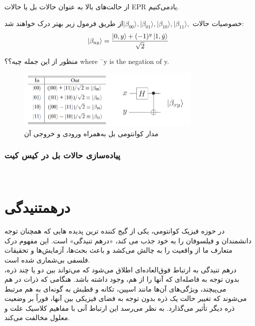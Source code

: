 \documentclass{book}
\begin{document}
 از حالت‌های بالا به عنوان حالات بل یا حالات EPR یاد‌می‌کنیم.
  
  
خصوصیات حالات $\vert \beta_{00} \rangle, \vert \beta_{01} \rangle, \vert \beta_{10} \rangle, \vert \beta_{11} \rangle,$از طریق فرمول زیر بهتر درک خواهند شد:
\begin{equation}\label{Bell formula}
	\ket{\beta_{ay}} = \frac{\ket{0, y} + (-1)^{y} \ket{1, \bar{y}}}{\sqrt{2}}
\end{equation}

منظور از این جمله چیه؟؟
where ¯y is the negation of y.




 
\begin{figure}[ht]
	\centering
	\includegraphics[width=0.8\textwidth]{Bell_state.png}
	\caption{مدار کوانتومی بل به‌همراه ورودی و خروجی آن}
\end{figure}
 
 
 
 
 
 \subsubsection{پیاده‌سازی حالات بل در کیس کیت}
 
\begin{verbatim}
	

\end{verbatim}

\newpage






\section{درهمتنیدگی}
در حوزه فیزیک کوانتومی، یکی از گیج کننده ترین پدیده هایی که همچنان توجه دانشمندان و فیلسوفان را به خود جذب می کند، «درهم تنیدگی» است. این مفهوم درک متعارف ما از واقعیت را به چالش می‌کشد و باعث بحث‌ها، آزمایش‌ها و تحقیقات فلسفی بی‌شماری شده است.\\
درهم تنیدگی به ارتباط فوق‌العاده‌ای اطلاق می‌شود که می‌تواند بین دو یا چند ذره، بدون توجه به فاصله‌ای که آنها را از هم، وجود داشته باشد. هنگامی که ذرات در هم می‌پیچند، ویژگی‌های آن‌ها مانند اسپین، تکانه و قطبش به گونه‌ای به هم مرتبط می‌شوند که تغییر حالت یک ذره بدون توجه به فضای فیزیکی بین آنها، فوراً بر وضعیت ذره دیگر تأثیر می‌گذارد. به نظر می‌رسد این ارتباط آنی با مفاهیم کلاسیک علت و معلول مخالفت می‌کند.\\
\end{document}
